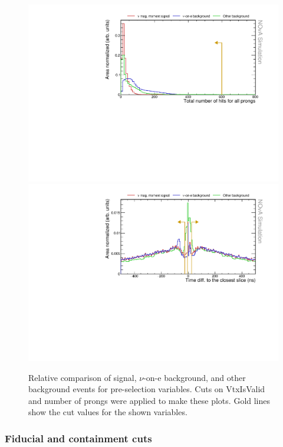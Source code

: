 \begin{figure}[hbtp]
\centering
\includegraphics[width=.9\textwidth]{Plots/NuMMEventSelection/N1Cut_NHits.pdf}
\includegraphics[width=.9\textwidth]{Plots/NuMMEventSelection/N1Cut_closestSlice.pdf}
\caption{Relative comparison of signal, $\nu$-on-e background, and other background events for pre-selection variables. Cuts on VtxIsValid and number of prongs were applied to make these plots. Gold lines show the cut values for the shown variables.}
\label{fig:PreSelectionCuts2}
\end{figure}


\subsubsection*{Fiducial and containment cuts}

